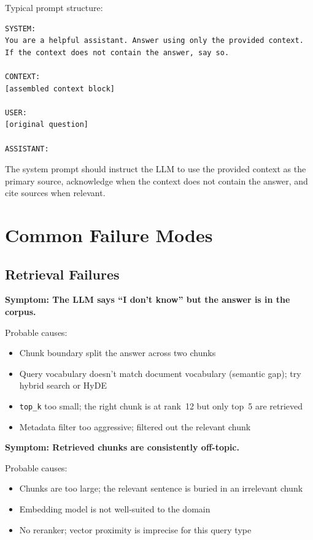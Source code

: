 Typical prompt structure:

\begin{Verbatim}
SYSTEM:
You are a helpful assistant. Answer using only the provided context.
If the context does not contain the answer, say so.

CONTEXT:
[assembled context block]

USER:
[original question]

ASSISTANT:
\end{Verbatim}

The system prompt should instruct the LLM to use the provided context as the primary source,
acknowledge when the context does not contain the answer, and cite sources when relevant.

\section{Common Failure Modes}

\subsection{Retrieval Failures}

\textbf{Symptom: The LLM says ``I don't know'' but the answer is in the corpus.}

Probable causes:

\begin{itemize}
    \item Chunk boundary split the answer across two chunks
    \item Query vocabulary doesn't match document vocabulary (semantic gap); try hybrid search or HyDE
    \item \texttt{top\_k} too small; the right chunk is at rank~12 but only top~5 are retrieved
    \item Metadata filter too aggressive; filtered out the relevant chunk
\end{itemize}

\textbf{Symptom: Retrieved chunks are consistently off-topic.}

Probable causes:

\begin{itemize}
    \item Chunks are too large; the relevant sentence is buried in an irrelevant chunk
    \item Embedding model is not well-suited to the domain
    \item No reranker; vector proximity is imprecise for this query type
\end{itemize}

